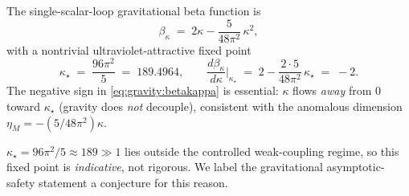 \begin{conjecture}
\label{conj:gravity:as}
\label{sec:gravity:as}
\label{sec:gravity:AS}
The single-scalar-loop gravitational beta function is
\begin{equation}\label{eq:gravity:betakappa}
  \beta_{\kappa} \;=\; 2\kappa - \frac{5}{48\pi^{2}}\,\kappa^{2},
\end{equation}
with a nontrivial ultraviolet-attractive fixed point
\begin{equation}\label{eq:gravity:kappastar}
  \kappa_{\star} \;=\; \frac{96\pi^{2}}{5} \;=\; 189.4964,
  \qquad
  \frac{d\beta_{\kappa}}{d\kappa}\Big|_{\kappa_{\star}}
  \;=\; 2 - \frac{2\cdot 5}{48\pi^{2}}\,\kappa_{\star}
  \;=\; -2 .
\end{equation}
The negative sign in \eqref{eq:gravity:betakappa} is essential: $\kappa$
flows \emph{away} from $0$ toward $\kappa_{\star}$ (gravity does \emph{not}
decouple), consistent with the anomalous dimension
$\eta_{M}=-(5/48\pi^{2})\kappa$.
\end{conjecture}

\begin{remark}[Caveat]
\label{rmk:gravity:caveat}
$\kappa_{\star}=96\pi^{2}/5\approx 189\gg 1$ lies outside the controlled
weak-coupling regime, so this fixed point is \emph{indicative}, not
rigorous. We label the gravitational asymptotic-safety statement a
conjecture for this reason.
\end{remark}

